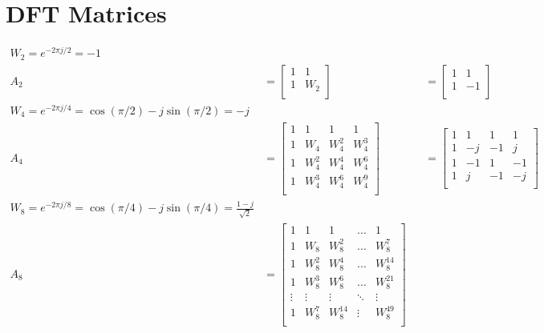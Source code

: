 
\appendix

\section{DFT Matrices}\label{app:DFT}

\begin{align*}
	W_2 = e^{-2\pi j / 2} = -1 \\
	A_2 &= 
		\begin{bmatrix}
			1& 1 \\
			1& W_2 \\
		\end{bmatrix}
		&&= 
		\begin{bmatrix}
			1& 1 \\
			1& -1 \\
		\end{bmatrix}	 \\
	W_4 = e^{-2\pi j / 4} = \cos(\pi/2) - j\sin(\pi/2) = -j \\
	A_4 &= 
		\begin{bmatrix}
			1& 1& 1& 1 \\
			1& W_4& W_4^2& W_4^3 \\
			1& W_4^2& W_4^4& W_4^6 \\
			1& W_4^3& W_4^6& W_4^9 \\
		\end{bmatrix}
		&&=
		\begin{bmatrix}
			1& 1& 1& 1 \\
			1& -j& -1& j \\
			1& -1& 1& -1 \\
			1& j& -1& -j \\
		\end{bmatrix} \\
	W_8 = e^{-2\pi j / 8} = \cos(\pi/4) - j\sin(\pi/4) = \frac{1-j}{\sqrt{2}} \\
	A_8 &= 
		\begin{bmatrix}
			1 & 1 & 1 & \dots & 1 \\
			1 & W_8 & W_8^2 & \dots & W_8^7 \\
			1 & W_8^2 & W_8^4 & \dots & W_8^14 \\
			1 & W_8^3 & W_8^6 & \dots & W_8^21 \\
			\vdots & \vdots & \vdots & \ddots & \vdots \\
			1 & W_8^7 & W_8^14 & \vdots & W_8^49 \\
		\end{bmatrix}
\end{align*}

